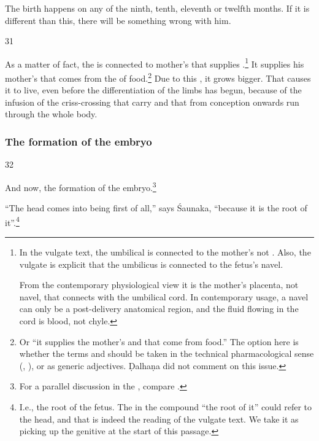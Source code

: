 \begin{translation}
The birth happens on any of the ninth, tenth, eleventh or twelfth months.  If it is 
different than this, there will be something wrong with him. 

\item[31]

As a matter of fact, the  is connected
to mother's  that supplies .\footnote{In
    the vulgate text, the umbilical is connected to the mother's
     not .  Also, the vulgate is explicit that the
    umbilicus is connected to the fetus's navel.
    
    From the contemporary physiological view it is the mother's
placenta, not navel, that connects with the umbilical cord.  In
contemporary usage, a navel can only be a post-delivery anatomical
region, and the fluid flowing in the cord is blood, not chyle.} It
supplies his mother's  that comes from the
 of food.\footnote{Or “it supplies the mother's
     and  that come from food.”
    The option here is whether the terms  and 
    should be taken in the technical pharmacological sense (, \cite[see][]{meul-1987}), or as generic
    adjectives.  Ḍalhaṇa did not comment on this issue.} Due to this
    , it grows bigger. That causes it to live,
    even before the differentiation of the limbs has begun, because of
    the infusion of the criss-crossing  that carry
     and that from conception onwards run through the
    whole body.

\subsubsection{The formation of the embryo}

\item[32]

And now, the formation of the embryo.\footnote{For a parallel discussion in 
the \CS, compare .}

“The head comes into being first of all,” says Śaunaka, “because it is the root of 
it”.\footnote{I.e., the root of the fetus. The  in the compound 
 “the root of it” could refer to the head, and that is indeed the 
reading of the vulgate text.  We take it as picking up the genitive 
 at the start of this passage.  
    
}
\end{translation}
